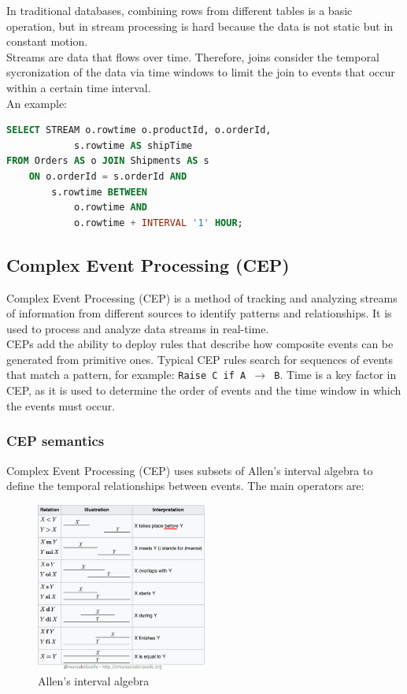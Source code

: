 In traditional databases, combining rows from different tables is a basic operation, but 
in stream processing is hard because the data is not static but in constant motion.\\

Streams are data that flows over time. Therefore, joins consider the temporal sycronization
of the data via time windows to limit the join to events that occur within a certain time
interval.\\

An example:

\begin{lstlisting}[language=SQL]
SELECT STREAM o.rowtime o.productId, o.orderId,
            s.rowtime AS shipTime
FROM Orders AS o JOIN Shipments AS s 
    ON o.orderId = s.orderId AND
        s.rowtime BETWEEN 
            o.rowtime AND 
            o.rowtime + INTERVAL '1' HOUR;
\end{lstlisting}


\subsection{Complex Event Processing (CEP)}

Complex Event Processing (CEP) is a method of tracking and analyzing streams of information
from different sources to identify patterns and relationships. It is used to process and analyze
data streams in real-time.\\

CEPs add the ability to deploy rules that describe how composite events can be generated from
primitive ones. Typical CEP rules search for sequences of events that match a pattern, for
example: \texttt{Raise C if A $\rightarrow$ B}. Time is a key factor in CEP, as it is used to
determine the order of events and the time window in which the events must occur.\\

\subsubsection{CEP semantics}

Complex Event Processing (CEP) uses subsets of Allen's interval algebra to define the temporal
relationships between events. The main operators are:

\begin{figure}[H]
    \centering
    \includegraphics[width=0.5\textwidth]{figures/image_Allen_interv_alg.png}
    \caption{Allen's interval algebra}
    \label{fig:interval_alg}
\end{figure}

